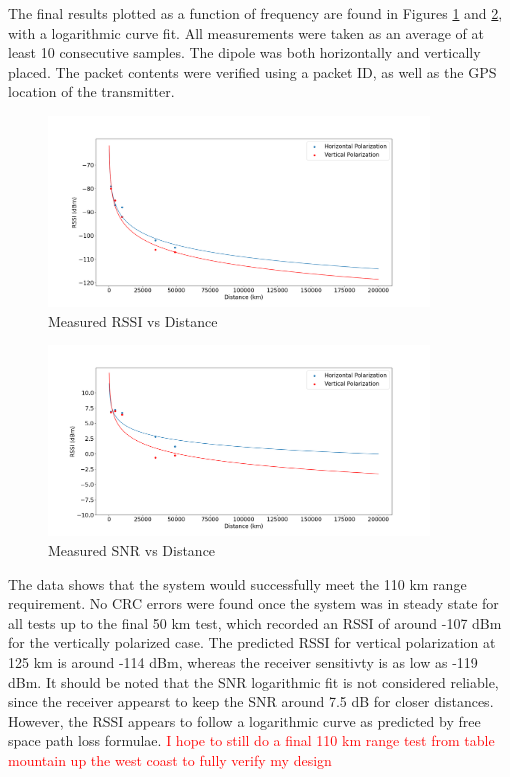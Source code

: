 The final results plotted as a function of frequency are found in Figures \ref{fig:rangeRssi} and \ref{fig:rangeSnr}, with a logarithmic curve fit. All measurements were taken as an average of at least 10 consecutive samples. The dipole was both horizontally and vertically placed. The packet contents were verified using a packet ID, as well as the GPS location of the transmitter.

\begin{figure}[!htb]
  \centering
  \includegraphics[width=0.9\textwidth]{rangeRssi}
  \caption{Measured RSSI vs Distance}
  \label{fig:rangeRssi}
\end{figure}

\begin{figure}[!htb]
  \centering
  \includegraphics[width=0.9\textwidth]{rangeSnr}
  \caption{Measured SNR vs Distance}
  \label{fig:rangeSnr}
\end{figure}

The data shows that the system would successfully meet the 110 km range requirement. No CRC errors were found once the system was in steady state for all tests up to the final 50 km test, which recorded an RSSI of around -107 dBm for the vertically polarized case. The predicted RSSI for vertical polarization at 125 km is around -114 dBm, whereas the receiver sensitivty is as low as -119 dBm. It should be noted that the SNR logarithmic fit is not considered reliable, since the receiver appearst to keep the SNR around 7.5 dB for closer distances. However, the RSSI appears to follow a logarithmic curve as predicted by free space path loss formulae. \textcolor{red}{I hope to still do a final 110 km range test from table mountain up the west coast to fully verify my design}
